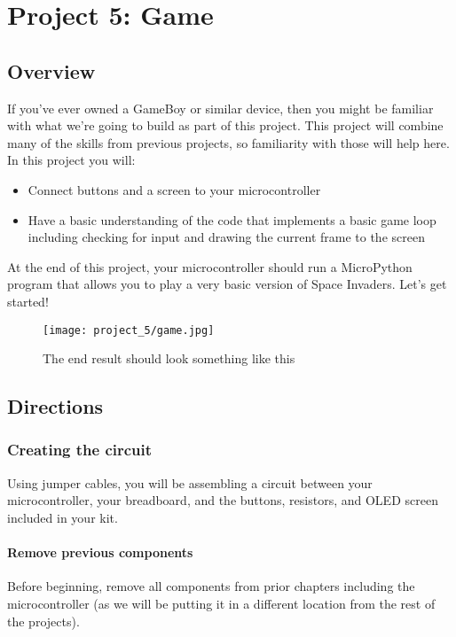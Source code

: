 \chapter{Project 5: Game}

\section{Overview}
If you've ever owned a GameBoy or similar device, then you might be familiar with what we're going to build as part of this project.
This project will combine many of the skills from previous projects, so familiarity with those will help here. In this project you will:
\begin{itemize}
    \item Connect buttons and a screen to your microcontroller
    \item Have a basic understanding of the code that implements a basic game loop including checking for input and drawing the current frame to the screen
\end{itemize}
At the end of this project, your microcontroller should run a MicroPython program that allows you to play a very basic version of
Space Invaders. Let's get started!
\begin{figure}[H]
\centering
    \texttt{[image: project\_5/game.jpg]}
    \caption{The end result should look something like this}
\end{figure}

\pagebreak

\section{Directions}

\subsection{Creating the circuit}
Using jumper cables, you will be assembling a circuit between your microcontroller, your breadboard, and the buttons,
resistors, and OLED screen included in your kit.

\subsubsection{Remove previous components}
Before beginning, remove all components from prior chapters including the microcontroller (as we will be putting it in
a different location from the rest of the projects).

